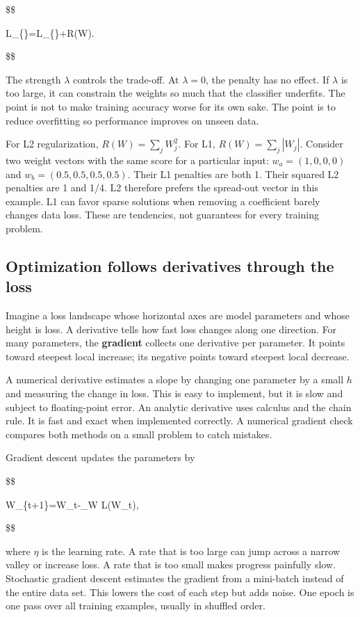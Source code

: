 \$\$

L\_\{\}=L\_\{\}+\lambda R(W).

\$\$

The strength \(\lambda\) controls the trade-off. At \(\lambda=0\), the penalty has no effect. If \(\lambda\) is too large, it can constrain the weights so much that the classifier underfits. The point is not to make training accuracy worse for its own sake. The point is to reduce overfitting so performance improves on unseen data.

For L2 regularization, \(R(W)=\sum_j W_j^2\). For L1, \(R(W)=\sum_j|W_j|\). Consider two weight vectors with the same score for a particular input: \(w_a=(1,0,0,0)\) and \(w_b=(0.5,0.5,0.5,0.5)\). Their L1 penalties are both 1. Their squared L2 penalties are 1 and 1/4. L2 therefore prefers the spread-out vector in this example. L1 can favor sparse solutions when removing a coefficient barely changes data loss. These are tendencies, not guarantees for every training problem.

\subsection{Optimization follows derivatives through the loss}\label{04-visual-computing-ii-ch031-optimization-follows-derivatives-through-the-loss}

Imagine a loss landscape whose horizontal axes are model parameters and whose height is loss. A derivative tells how fast loss changes along one direction. For many parameters, the \textbf{gradient} collects one derivative per parameter. It points toward steepest local increase; its negative points toward steepest local decrease.

A numerical derivative estimates a slope by changing one parameter by a small \(h\) and measuring the change in loss. This is easy to implement, but it is slow and subject to floating-point error. An analytic derivative uses calculus and the chain rule. It is fast and exact when implemented correctly. A numerical gradient check compares both methods on a small problem to catch mistakes.

Gradient descent updates the parameters by

\$\$

W\_\{t+1\}=W\_t-\eta\nabla\_W L(W\_t),

\$\$

where \(\eta\) is the learning rate. A rate that is too large can jump across a narrow valley or increase loss. A rate that is too small makes progress painfully slow. Stochastic gradient descent estimates the gradient from a mini-batch instead of the entire data set. This lowers the cost of each step but adds noise. One epoch is one pass over all training examples, usually in shuffled order.


